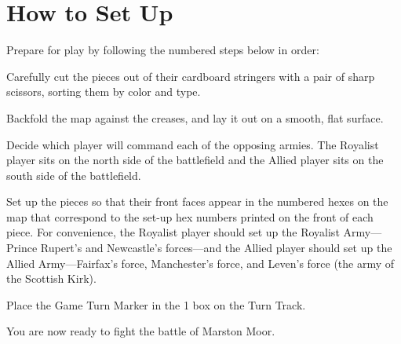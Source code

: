 \columnbreak
\section{How to Set Up}

Prepare for play by following the numbered steps below in order:

\begin{steps}
  \item Carefully cut the pieces out of their cardboard stringers with a pair of sharp scissors, sorting them by color and type.
  \item Backfold the map against the creases, and lay it out on a smooth, flat surface.
  \item Decide which player will command each of the opposing armies. The Royalist player sits on the north side of the battlefield and the Allied player sits on the south side of the battlefield.
  \item Set up the pieces so that their front faces appear in the numbered hexes on the map that correspond to the set-up hex numbers printed on the front of each piece. For convenience, the Royalist player should set up the Royalist Army---Prince Rupert's and Newcastle's forces---and the Allied player should set up the Allied Army---Fairfax's force, Manchester's force, and Leven's force (the army of the Scottish Kirk).
  \item Place the Game Turn Marker in the 1 box on the Turn Track.
\end{steps}

You are now ready to fight the battle of Marston Moor.
